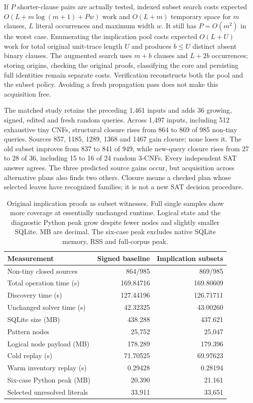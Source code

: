 \documentclass[11pt,a4paper]{article}
\numberwithin{equation}{section}
\theoremstyle{plain}
\theoremstyle{definition}
\theoremstyle{remark}
\begin{document}
If $P$ shorter-clause pairs are actually tested, indexed subset search costs expected $O(L+m\log(m+1)+Pw)$ work and $O(L+m)$ temporary space for $m$ clauses, $L$ literal occurrences and maximum width $w$. It still has $P=O(m^2)$ in the worst case. Enumerating the implication pool costs expected $O(L+U)$ work for total original unit-trace length $U$ and produces $b\leq U$ distinct absent binary clauses. The augmented search uses $m+b$ clauses and $L+2b$ occurrences; storing origins, checking the original proofs, classifying the core and persisting full identities remain separate costs. Verification reconstructs both the pool and the subset policy. Avoiding a fresh propagation pass does not make this acquisition free.

The matched study retains the preceding 1,461 inputs and adds 36 growing, signed, edited and fresh random queries. Across 1,497 inputs, including 512 exhaustive tiny CNFs, structural closure rises from 864 to 869 of 985 non-tiny queries. Sources 857, 1185, 1289, 1368 and 1467 gain closure; none loses it. The old subset improves from 837 to 841 of 949, while new-query closure rises from 27 to 28 of 36, including 15 to 16 of 24 random 3-CNFs. Every independent SAT answer agrees. The three predicted source gains occur, but acquisition across alternative plans also finds two others. Closure means a checked plan whose selected leaves have recognized families; it is not a new SAT decision procedure.

\begin{table}[t]
\centering
\small
\begin{tabular}{lrr}
\toprule
Measurement & Signed baseline & Implication subsets \\
\midrule
Non-tiny closed sources & 864/985 & 869/985 \\
Total operation time (s) & 169.84716 & 169.80609 \\
Discovery time (s) & 127.44196 & 126.71711 \\
Unchanged solver time (s) & 42.32325 & 43.00260 \\
SQLite size (MB) & 438.288 & 437.621 \\
Pattern nodes & 25,752 & 25,047 \\
Logical node payload (MB) & 178.289 & 179.396 \\
Cold replay (s) & 71.70525 & 69.97623 \\
Warm inventory replay (s) & 0.29428 & 0.28194 \\
Six-case Python peak (MB) & 20.390 & 21.161 \\
Selected unresolved literals & 33,911 & 33,651 \\
\bottomrule
\end{tabular}
\caption{Original implication proofs as subset witnesses. Full single samples show more coverage at essentially unchanged runtime. Logical state and the diagnostic Python peak grow despite fewer nodes and slightly smaller SQLite. MB are decimal. The six-case peak excludes native SQLite memory, RSS and full-corpus peak.}
\label{tab:implied-subsumption}
\end{table}
\end{document}
